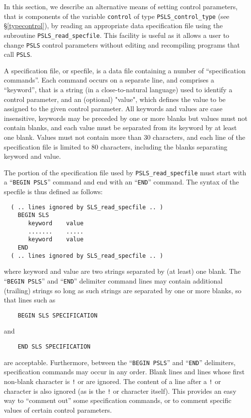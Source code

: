 \documentclass{galahad}
\newcommand{\packagename}{PSLS}
\begin{document}

\galcontrolfeatures
\noindent In this section, we describe an alternative means of setting
control parameters, that is components of the variable {\tt control} of type
{\tt \packagename\_control\_type}
(see \S\ref{typecontrol}),
by reading an appropriate data specification file using the
subroutine {\tt \packagename\_read\_specfile}. This facility
is useful as it allows a user to change  {\tt \packagename} control parameters
without editing and recompiling programs that call {\tt \packagename}.

A specification file, or specfile, is a data file containing a number of
``specification commands''. Each command occurs on a separate line,
and comprises a ``keyword'',
that is a string (in a close-to-natural language) used to identify a
control parameter, and
an (optional) "value", which defines the value to be assigned to the given
control parameter. All keywords and values are case insensitive,
keywords may be preceded by one or more blanks but
values must not contain blanks, and
each value must be separated from its keyword by at least one blank.
Values must not contain more than 30 characters, and
each line of the specification file is limited to 80 characters,
including the blanks separating keyword and value.

The portion of the specification file used by
{\tt \packagename\_read\_specfile}
must start
with a ``{\tt BEGIN \packagename}'' command and end with an
``{\tt END}'' command.  The syntax of the specfile is thus defined as follows:
\begin{verbatim}
  ( .. lines ignored by SLS_read_specfile .. )
    BEGIN SLS
       keyword    value
       .......    .....
       keyword    value
    END
  ( .. lines ignored by SLS_read_specfile .. )
\end{verbatim}
where keyword and value are two strings separated by (at least) one blank.
The ``{\tt BEGIN \packagename}'' and ``{\tt END}'' delimiter command lines
may contain additional (trailing) strings so long as such strings are
separated by one or more blanks, so that lines such as
\begin{verbatim}
    BEGIN SLS SPECIFICATION
\end{verbatim}
and
\begin{verbatim}
    END SLS SPECIFICATION
\end{verbatim}
are acceptable. Furthermore,
between the
``{\tt BEGIN \packagename}'' and ``{\tt END}'' delimiters,
specification commands may occur in any order.  Blank lines and
lines whose first non-blank character is {\tt !} or {\tt *} are ignored.
The content
of a line after a {\tt !} or {\tt *} character is also
ignored (as is the {\tt !} or {\tt *}
character itself). This provides an easy way to ``comment out'' some
specification commands, or to comment specific values
of certain control parameters.
\end{document}
